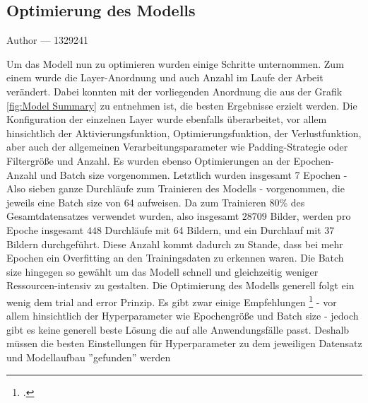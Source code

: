 \documentclass[12pt, a4paper]{report}
\makeatletter
\newcommand{\sectionauthor}[1]{%
  {\parindent0pt\vspace*{-5pt}%
  \large{Author --- }
  \linespread{1.1}\large\scshape#1%
  \par\nobreak\vspace*{35pt} }
  \@afterheading%
}
\makeatother
\begin{document}
\subsection{Optimierung des Modells}
\sectionauthor{1329241}
Um das Modell nun zu optimieren wurden einige Schritte unternommen. Zum einem wurde die Layer-Anordnung und auch Anzahl im Laufe der Arbeit verändert. Dabei konnten mit der vorliegenden Anordnung die aus der Grafik \ref{fig:Model Summary} zu entnehmen ist, die besten Ergebnisse erzielt werden. Die Konfiguration der einzelnen Layer wurde ebenfalls überarbeitet, vor allem hinsichtlich der Aktivierungsfunktion, Optimierungsfunktion, der Verlustfunktion, aber auch der allgemeinen Verarbeitungsparameter wie Padding-Strategie oder Filtergröße und Anzahl. Es wurden ebenso Optimierungen an der Epochen-Anzahl und Batch size vorgenommen. Letztlich wurden insgesamt 7 Epochen - Also sieben ganze Durchläufe zum Trainieren des Modells - vorgenommen, die jeweils eine Batch size von  64 aufweisen. Da zum Trainieren 80\% des Gesamtdatensatzes verwendet wurden, also insgesamt $ 28709 $ Bilder, werden pro Epoche insgesamt $ 448 $ Durchläufe mit 64 Bildern, und ein Durchlauf mit $ 37 $ Bildern durchgeführt. Diese Anzahl kommt dadurch zu Stande, dass bei mehr Epochen ein Overfitting an den Trainingsdaten zu erkennen waren. Die Batch size hingegen so gewählt um das Modell schnell und gleichzeitig weniger Ressourcen-intensiv zu gestalten. Die Optimierung des Modells generell folgt ein wenig dem trial and error Prinzip. Es gibt zwar einige Empfehlungen 
\footcite[Vgl.][]{ModellOptimierung}
 - vor allem hinsichtlich der Hyperparameter wie Epochengröße und Batch size - jedoch gibt es keine generell beste Lösung die auf alle Anwendungsfälle passt. Deshalb müssen die besten Einstellungen für Hyperparameter zu dem jeweiligen Datensatz und Modellaufbau ''gefunden'' werden
\end{document}
